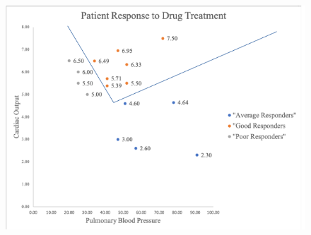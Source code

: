 \documentclass[11pt,addpoints,answers]{exam}
\begin{document}
        \begin{figure}[H]
        \centering
        \includegraphics[width=1\textwidth]{drawn_patients.png}
        \end{figure}
\end{document}
